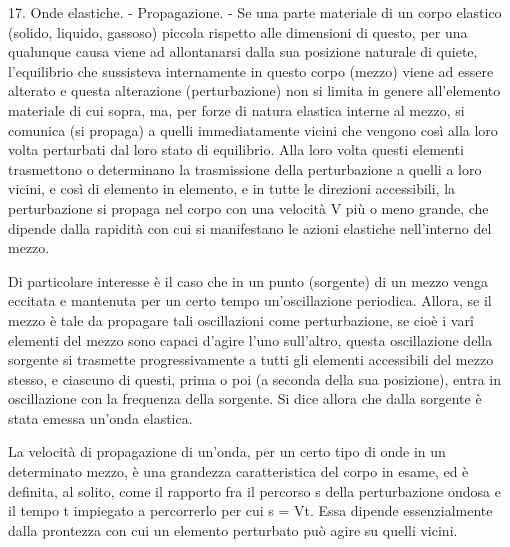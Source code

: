 \documentclass[a4paper]{article}
\begin{document}
17. Onde elastiche. - Propagazione. - Se una parte materiale di un corpo elastico (solido, liquido, gassoso) piccola rispetto alle dimensioni di questo, per una qualunque causa viene ad allontanarsi dalla sua posizione naturale di quiete, l'equilibrio che sussisteva internamente in questo corpo (mezzo) viene ad essere alterato e questa alterazione (perturbazione) non si limita in genere all'elemento materiale di cui sopra, ma, per forze di natura elastica interne al mezzo, si comunica (si propaga) a quelli immediatamente vicini che vengono così alla loro volta perturbati dal loro stato di equilibrio. Alla loro volta questi elementi trasmettono o determinano la trasmissione della perturbazione a quelli a loro vicini, e così di elemento in elemento, e in tutte le direzioni accessibili, la perturbazione si propaga nel corpo con una velocità V più o meno grande, che dipende dalla rapidità con cui si manifestano le azioni elastiche nell'interno del mezzo.

Di particolare interesse è il caso che in un punto (sorgente) di un mezzo venga eccitata e mantenuta per un certo tempo un'oscillazione periodica. Allora, se il mezzo è tale da propagare tali oscillazioni come perturbazione, se cioè i varî elementi del mezzo sono capaci d'agire l'uno sull'altro, questa oscillazione della sorgente si trasmette progressivamente a tutti gli elementi accessibili del mezzo stesso, e ciascuno di questi, prima o poi (a seconda della sua posizione), entra in oscillazione con la frequenza della sorgente. Si dice allora che dalla sorgente è stata emessa un'onda elastica.

La velocità di propagazione di un'onda, per un certo tipo di onde in un determinato mezzo, è una grandezza caratteristica del corpo in esame, ed è definita, al solito, come il rapporto fra il percorso s della perturbazione ondosa e il tempo t impiegato a percorrerlo per cui s = Vt. Essa dipende essenzialmente dalla prontezza con cui un elemento perturbato può agire su quelli vicini.
\end{document}
